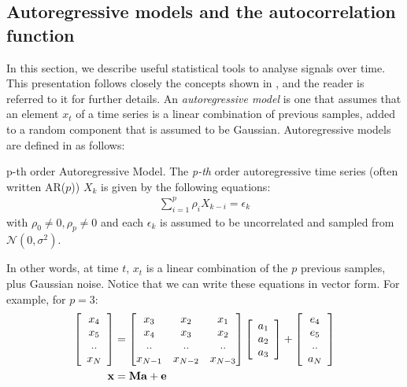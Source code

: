 \documentclass[../main.tex]{subfiles}
\begin{document}
\subsection{Autoregressive models and the autocorrelation function} \label{subsection_autoregression}
In this section, we describe useful statistical tools to analyse signals over time. This presentation follows closely the concepts shown in \cite{Roberts2014}, and the reader is referred to it for further details. An \emph{autoregressive model} is one that assumes that an element $x_t$ of a time series is a linear combination of previous samples, added to a random component that is assumed to be Gaussian. Autoregressive models are defined in \cite{Johnston} as follows:
\begin{definition}{p-th order Autoregressive Model.} \label{def_ar}
The \emph{p-th} order autoregressive time series (often written AR($p$)) $X_k$ is given by the following equations:
\begin{align*}
\sum_{i=1}^p{\rho_iX_{k-i}} = \epsilon_k
\end{align*}
with $\rho_0 \neq 0, \rho_p \neq 0$ and each $\epsilon_k$ is assumed to be uncorrelated and sampled from $\mathcal{N}(0, \sigma^2)$.
\end{definition}
\par In other words, at time $t$, $x_t$ is a linear combination of the $p$ previous samples, plus Gaussian noise. Notice that we can write these equations in vector form. For example, for $p=3$:
\begin{align*}
\left[ \begin{array}{c} x_4 \\ x_5 \\ .. \\ x_N  \end{array} \right] &= \begin{bmatrix} x_3 & x_2 & x_1 \\ x_4 & x_3 & x_2 \\ .. & .. & .. \\ x_{N-1} & x_{N-2} & x_{N-3} \end{bmatrix} \left[ \begin{array}{c} a_1 \\ a_2 \\ a_3 \end{array} \right] + \left[ \begin{array}{c} e_4 \\ e_5 \\ .. \\ a_N \end{array}
\right]\\
\mathbf{x} &= \mathbf{Ma} + \mathbf{e}
\end{align*}
\end{document}
